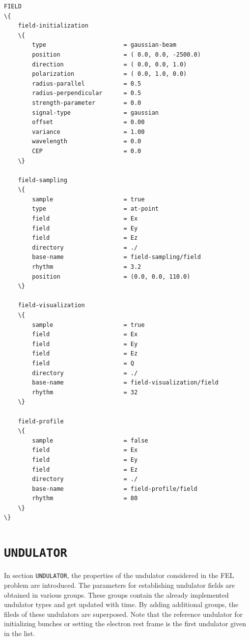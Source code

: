 \begin{snugshade}
\begin{Verbatim}[fontsize=\small, tabsize=4, fontfamily=courier, fontseries=b, commandchars=\\\{\}, obeytabs]
FIELD
\{
	field-initialization
	\{
		type					  = gaussian-beam
		position				  = ( 0.0, 0.0, -2500.0)
		direction				  = ( 0.0, 0.0, 1.0)
		polarization			  = ( 0.0, 1.0, 0.0)
		radius-parallel			  = 0.5
		radius-perpendicular	  = 0.5
		strength-parameter		  = 0.0
		signal-type				  = gaussian
		offset					  = 0.00
		variance				  = 1.00
		wavelength				  = 0.0
		CEP						  = 0.0
	\}
	
	field-sampling
	\{
		sample					  = true
		type					  = at-point
		field					  = Ex
		field					  = Ey
		field					  = Ez
		directory				  = ./
		base-name				  = field-sampling/field
		rhythm					  = 3.2
		position				  = (0.0, 0.0, 110.0)
	\}
	
	field-visualization
	\{
		sample					  = true
		field					  = Ex
		field					  = Ey
		field					  = Ez
		field					  = Q
		directory				  = ./
		base-name				  = field-visualization/field
		rhythm					  = 32
	\}
	
	field-profile
	\{
		sample					  = false
		field					  = Ex
		field					  = Ey
		field					  = Ez
		directory				  = ./
		base-name				  = field-profile/field
		rhythm					  = 80
	\}
\}
\end{Verbatim}
\end{snugshade}

\section{\texttt{UNDULATOR}}

In section \texttt{UNDULATOR}, the properties of the undulator considered in the FEL problem are introduced.
%
The parameters for establishing undulator fields are obtained in various groups.
%
These groups contain the already implemented undulator types and get updated with time.
%
By adding additional groups, the fileds of these undulators are superposed.
%
Note that the reference undulator for initializing bunches or setting the electron rest frame is the first undulator given in the list.

